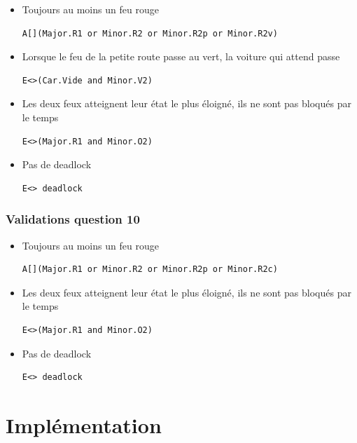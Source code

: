 \documentclass[11pt]{article}
\begin{document}
\begin{itemize}
	\item Toujours au moins un feu rouge
\begin{verbatim}
A[](Major.R1 or Minor.R2 or Minor.R2p or Minor.R2v)
\end{verbatim}
	
	\item Lorsque le feu de la petite route passe au vert, la voiture qui attend passe
\begin{verbatim}
E<>(Car.Vide and Minor.V2)
\end{verbatim}
	
	\item Les deux feux atteignent leur état le plus éloigné, ils ne sont pas bloqués par le temps
\begin{verbatim}
E<>(Major.R1 and Minor.O2)
\end{verbatim}
	
	\item Pas de deadlock
\begin{verbatim}
E<> deadlock
\end{verbatim}

\end{itemize}

\subsubsection{Validations question 10}

\begin{itemize}
	\item Toujours au moins un feu rouge
\begin{verbatim}
A[](Major.R1 or Minor.R2 or Minor.R2p or Minor.R2c)
\end{verbatim}

	\item Les deux feux atteignent leur état le plus éloigné, ils ne sont pas bloqués par le temps
\begin{verbatim}
E<>(Major.R1 and Minor.O2)
\end{verbatim}

	\item Pas de deadlock
\begin{verbatim}
E<> deadlock
\end{verbatim}
\end{itemize}

\section{Implémentation}
\end{document}
